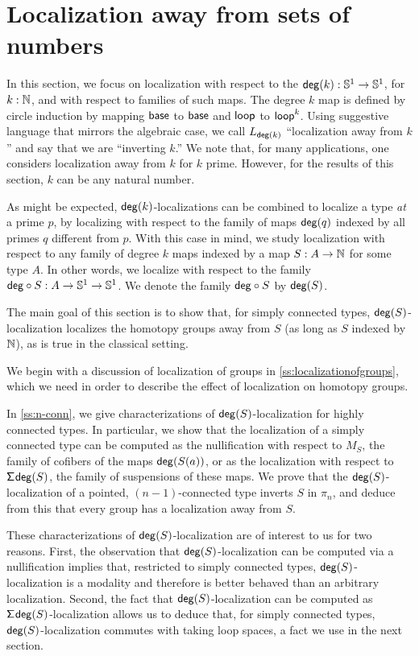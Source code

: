 \section{Localization away from sets of numbers}\label{section:localizationaway}

In this section, we focus on localization with respect to the  $\mathsf{deg}(k) : \mathbb{S}^{1} \to \mathbb{S}^{1}$, for $k : \mathbb{N}$, and with respect to
families of such maps.
The degree $k$ map is defined by circle induction by mapping $\mathsf{base}$ to $\mathsf{base}$
and $\mathsf{loop}$ to $\mathsf{loop}^k$.
Using suggestive language that mirrors the algebraic case, we call $L_{\mathsf{deg}(k)}$
``localization away from $k$'' and say that we are ``inverting $k$.''
We note that, for many applications, one considers localization away from $k$ for $k$ prime.
However, for the results of this section, $k$ can be any natural number.

As might be expected, $\mathsf{deg}(k)$-localizations can be combined to localize a type \emph{at}
a prime $p$, by localizing with respect to the family of maps $\mathsf{deg}(q)$ indexed by all
primes $q$ different from $p$.
With this case in mind, we study localization with respect to any family of degree $k$ maps
indexed by a map $S : A \to \mathbb{N}$ for some type $A$.
In other words, we localize with respect to the family $\mathsf{deg}\circ S : A \to \mathbb{S}^{1} \to \mathbb{S}^{1}$.
We denote the family $\mathsf{deg}\circ S$ by $\mathsf{deg}(S)$.

The main goal of this section is to show that, for simply connected types,
$\mathsf{deg}(S)$-localization localizes the homotopy groups away from $S$ (as long as $S$ indexed by $\mathbb{N}$),
as is true in the classical setting.

We begin with a discussion of localization of groups in \cref{ss:localizationofgroups}, which we need in order to describe the effect of localization on homotopy groups.

In \cref{ss:n-conn}, we give characterizations of $\mathsf{deg}(S)$-localization for highly connected types. In particular, we show that the localization of a simply connected type can be computed as the nullification with respect to $M_S$, the family of cofibers of the maps $\mathsf{deg}(S(a))$, or as the localization with respect to $\mathsf{\Sigma}^{} \mathsf{deg}(S)$, the family of suspensions of these maps.
We prove that the $\mathsf{deg}(S)$-localization of a pointed, $(n-1)$-connected type inverts $S$ in $\pi_n$,
and deduce from this that every group has a localization away from $S$.

These characterizations of $\mathsf{deg}(S)$-localization are of interest to us for two reasons. First, the observation that $\mathsf{deg}(S)$-localization can be computed via a nullification implies that, restricted to simply connected types, $\mathsf{deg}(S)$-localization is a modality and therefore is better behaved than an arbitrary localization. Second, the fact that $\mathsf{deg}(S)$-localization can be computed as $\mathsf{\Sigma}^{} \mathsf{deg}(S)$-localization allows us to deduce that, for simply connected types, $\mathsf{deg}(S)$-localization commutes with taking loop spaces, a fact we use in the next section.


